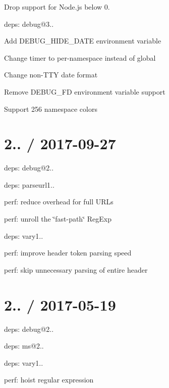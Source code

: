 
\begin{DoxyItemize}
\item Drop support for Node.\+js below 0.
\item deps\+: debug@3..
\begin{DoxyItemize}
\item Add {\ttfamily D\+E\+B\+U\+G\+\_\+\+H\+I\+D\+E\+\_\+\+D\+A\+TE} environment variable
\item Change timer to per-\/namespace instead of global
\item Change non-\/\+T\+TY date format
\item Remove {\ttfamily D\+E\+B\+U\+G\+\_\+\+FD} environment variable support
\item Support 256 namespace colors
\end{DoxyItemize}
\end{DoxyItemize}

\section*{2.. / 2017-\/09-\/27 }


\begin{DoxyItemize}
\item deps\+: debug@2..
\item deps\+: parseurl1..
\begin{DoxyItemize}
\item perf\+: reduce overhead for full U\+R\+Ls
\item perf\+: unroll the \char`\"{}fast-\/path\char`\"{} {\ttfamily Reg\+Exp}
\end{DoxyItemize}
\item deps\+: vary1..
\begin{DoxyItemize}
\item perf\+: improve header token parsing speed
\end{DoxyItemize}
\item perf\+: skip unnecessary parsing of entire header
\end{DoxyItemize}

\section*{2.. / 2017-\/05-\/19 }


\begin{DoxyItemize}
\item deps\+: debug@2..
\begin{DoxyItemize}
\item deps\+: ms@2..
\end{DoxyItemize}
\item deps\+: vary1..
\begin{DoxyItemize}
\item perf\+: hoist regular expression
\end{DoxyItemize}
\end{DoxyItemize}

